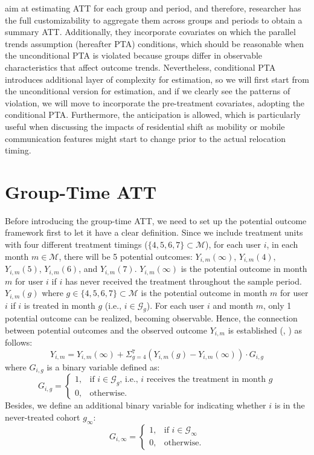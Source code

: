 \cite{callaway2021difference} aim at estimating ATT for each group and period, and therefore, researcher has the full customizability to aggregate them across groups and periods to obtain a summary ATT.
Additionally, they incorporate covariates on which the parallel trends assumption (hereafter PTA) conditions, which should be reasonable when the unconditional PTA is violated because groups differ in observable characteristics that affect outcome trends.
Nevertheless, conditional PTA introduces additional layer of complexity for estimation, so we will first start from the unconditional version for estimation, and if we clearly see the patterns of violation, we will move to incorporate the pre-treatment covariates, adopting the conditional PTA.
Furthermore, the anticipation is allowed, which is particularly useful when discussing the impacts of residential shift as mobility or mobile communication features might start to change prior to the actual relocation timing.

\section{Group-Time ATT}
Before introducing the group-time ATT, we need to set up the potential outcome framework first to let it have a clear definition.
Since we include treatment units with four different treatment timings ($\{4,5,6,7\} \subset \mathcal{M}$), for each user $i$, in each month $m \in \mathcal{M}$, there will be 5 potential outcomes: $Y_{i, m}(\infty)$, $Y_{i, m}(4)$, $Y_{i, m}(5)$, $Y_{i, m}(6)$, and $Y_{i, m}(7)$. $Y_{i, m}(\infty)$ is the potential outcome in month $m$ for user $i$ if $i$ has never received the treatment throughout the sample period.
$Y_{i, m}(g)$ where $g \in \{4,5,6,7\} \subset \mathcal{M}$ is the potential outcome in month $m$ for user $i$ if $i$ is treated in month $g$ (i.e., $i \in \mathcal{G}_g$).
For each user $i$ and month $m$, only 1 potential outcome can be realized, becoming observable.
Hence, the connection between potential outcomes and the observed outcome $Y_{i, m}$ is established (\cite{callaway2021difference}, \cite{sun2021estimating}) as follows:
\begin{equation}\label{eq:observed_outcome}
Y_{i, m}
= Y_{i, m}(\infty)
    + \Sigma_{g=4}^7 ( Y_{i, m}(g) - Y_{i, m}(\infty) ) \cdot G_{i, g}
\end{equation}
where $G_{i, g}$ is a binary variable defined as:
$$
G_{i, g} =
\begin{cases}
    1,
    & \text{if } i \in \mathcal{G}_g \text{, i.e., $i$ receives the treatment in month $g$} \\
    0,
    & \text{otherwise}.
\end{cases}
$$
Besides, we define an additional binary variable for indicating whether $i$ is in the never-treated cohort $g_\infty$:
$$
G_{i, \infty} =
\begin{cases}
    1,
    & \text{if } i \in \mathcal{G}_{\infty} \\
    0,
    & \text{otherwise}.
\end{cases}
$$

